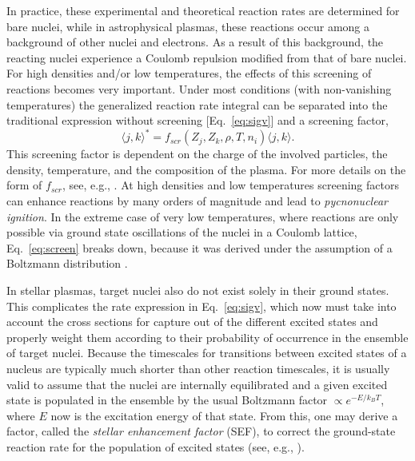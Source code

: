 \documentclass[12pt,modern,tighten,times,apj]{aastex61}
\newcommand{\eg}{e.g.}
\begin{document}
In practice, these experimental and theoretical reaction rates are determined for bare nuclei, while in astrophysical plasmas, these reactions occur among a background of other nuclei and electrons.  
As a result of this background, the reacting nuclei experience a Coulomb repulsion modified from 
that of bare nuclei. 
For high densities and/or low temperatures, the effects of this screening of reactions becomes very important. 
Under most conditions (with non-vanishing temperatures) the generalized reaction rate integral can be separated into the traditional expression without screening [Eq.~\ref{eq:sigv}] and a screening factor, 
\begin{equation}
    \langle j,k \rangle^*=f_{scr}(Z_j,Z_k,\rho,T,n_i) \langle j,k \rangle. 
    \label{eq:screen}
\end{equation}
This screening factor is dependent on the charge of the involved particles, the density, temperature, and the composition of the plasma. For more details on the form of $f_{scr}$, see, \eg, \cite{Salp54,DeGC73,Ichi93,BrSa97}.  
At high densities and low temperatures screening factors can enhance reactions by many orders of magnitude and lead to {\em pycnonuclear ignition}.
In the extreme case of very low temperatures, where reactions are only possible via ground state oscillations of the nuclei in a Coulomb lattice, Eq.~\ref{eq:screen} breaks down, because it was derived under the assumption of a Boltzmann distribution \cite{SaVa69,IcKi99}.

In stellar plasmas, target nuclei also do not exist solely in their ground states.  
This complicates the rate expression in Eq.~\ref{eq:sigv}, which now must take into account the cross sections for capture out of the different excited states and properly weight them according to their probability of occurrence in the ensemble of target nuclei.  
Because the timescales for transitions between excited states of a nucleus are typically much shorter than other reaction timescales, it is usually valid to assume that the nuclei are internally equilibrated and a given excited state is populated in the ensemble by the usual Boltzmann factor $\propto e^{-E/k_BT}$, where $E$ now is the excitation energy of that state.  
From this, one may derive a factor, called the {\em stellar enhancement factor} (SEF), to correct the ground-state reaction rate for the population of excited states (see, e.g., \cite{RaTh00,AARD99}).
\end{document}
